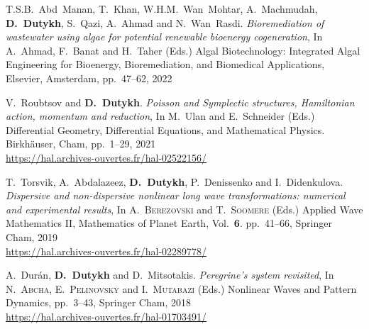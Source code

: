 \begin{etaremune}


  
  \item T.S.B.~Abd~Manan, T.~Khan, W.H.M.~Wan~Mohtar, A.~Machmudah, \textbf{D.~Dutykh}, S.~Qazi, A.~Ahmad and N.~Wan~Rasdi. \textit{Bioremediation of wastewater using algae for potential renewable bioenergy cogeneration}, In A.~Ahmad, F.~Banat and H.~Taher (Eds.) Algal Biotechnology: Integrated Algal Engineering for Bioenergy, Bioremediation, and Biomedical Applications, Elsevier, Amsterdam, pp.~47--62, 2022 %


  
  \item V.~Roubtsov and \textbf{D.~Dutykh}. \textit{Poisson and Symplectic structures, Hamiltonian action, momentum and reduction}, In M.~Ulan and E.~Schneider (Eds.) Differential Geometry, Differential Equations, and Mathematical Physics. Birkh\"auser, Cham, pp.~1--29, 2021 \\ %
  \url{https://hal.archives-ouvertes.fr/hal-02522156/}



  \item T.~Torsvik, A.~Abdalazeez, \textbf{D.~Dutykh}, P.~Denissenko and I.~Didenkulova. \textit{Dispersive and non-dispersive nonlinear long wave transformations: numerical and experimental results}, In A.~\textsc{Berezovski} and T.~\textsc{Soomere} (Eds.) Applied Wave Mathematics II, Mathematics of Planet Earth, Vol.~\textbf{6}. pp.~41--66, Springer Cham, 2019 \\ %
  \url{https://hal.archives-ouvertes.fr/hal-02289778/}
  


  \item A.~Dur\'an, \textbf{D.~Dutykh} and D.~Mitsotakis. \textit{Peregrine's system revisited}, In N.~\textsc{Abcha}, E.~\textsc{Pelinovsky} and I.~\textsc{Mutabazi} (Eds.) Nonlinear Waves and Pattern Dynamics, pp.~3--43, Springer Cham, 2018 \\ %
  \url{https://hal.archives-ouvertes.fr/hal-01703491/}
  

\end{etaremune}
